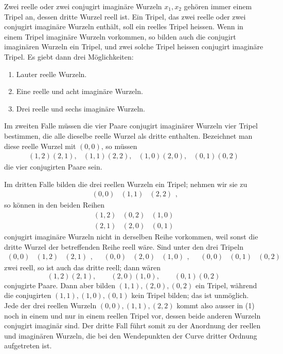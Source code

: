 \documentclass[11pt]{article}
\providecommand{\trip}[3]{\begin{array}{ccc}#1&#2&#3\end{array}}
\providecommand{\trip}[3]{\begin{array}{ccc}#1&#2&#3\end{array}}
\begin{document}
Zwei reelle oder zwei conjugirt imaginäre Wurzeln \(x_1,x_2\) gehören immer einem Tripel an, dessen dritte Wurzel reell ist. Ein Tripel, das zwei reelle oder zwei conjugirt imaginäre Wurzeln enthält, soll ein reelles Tripel heissen. Wenn in einem Tripel imaginäre Wurzeln vorkommen, so bilden auch die conjugirt imaginären Wurzeln ein Tripel, und zwei solche Tripel heissen conjugirt imaginäre Tripel. Es giebt dann drei Möglichkeiten:
\begin{enumerate}[label=\arabic*.]
\item Lauter reelle Wurzeln.
\item Eine reelle und acht imaginäre Wurzeln.
\item Drei reelle und sechs imaginäre Wurzeln.
\end{enumerate}

Im zweiten Falle müssen die vier Paare conjugirt imaginärer Wurzeln vier Tripel bestimmen, die alle dieselbe reelle Wurzel als dritte enthalten. Bezeichnet man diese reelle Wurzel mit \((0,0)\), so müssen
\[
\begin{array}{cccc}
(1,2)(2,1),&(1,1)(2,2),&(1,0)(2,0),&(0,1)(0,2)
\end{array}
\]
die vier conjugirten Paare sein.

Im dritten Falle bilden die drei reellen Wurzeln ein Tripel; nehmen wir sie zu
\begin{equation}
 \trip{(0,0)}{(1,1)}{(2,2)},
 \tag{1}
\end{equation}
so können in den beiden Reihen
\begin{equation}
\begin{array}{ccc}
(1,2)&(0,2)&(1,0)\\
(2,1)&(2,0)&(0,1)
\end{array}
\tag{2}
\end{equation}
conjugirt imaginäre Wurzeln nicht in derselben Reihe vorkommen, weil sonst die dritte Wurzel der betreffenden Reihe reell wäre. Sind unter den drei Tripeln
\[
\trip{(0,0)}{(1,2)}{(2,1)},
\quad
\trip{(0,0)}{(2,0)}{(1,0)},
\quad
\trip{(0,0)}{(0,1)}{(0,2)}
\]
zwei reell, so ist auch das dritte reell; dann wären
\[
(1,2)(2,1),
\qquad
(2,0)(1,0),
\qquad
(0,1)(0,2)
\]
conjugirte Paare. Dann aber bilden \((1,1),(2,0),(0,2)\) ein Tripel, während die conjugirten \((1,1),(1,0),(0,1)\) kein Tripel bilden; das ist unmöglich. Jede der drei reellen Wurzeln \((0,0),(1,1),(2,2)\) kommt also ausser in (1) noch in einem und nur in einem reellen Tripel vor, dessen beide anderen Wurzeln conjugirt imaginär sind. Der dritte Fall führt somit zu der Anordnung der reellen und imaginären Wurzeln, die bei den Wendepunkten der Curve dritter Ordnung aufgetreten ist.
\end{document}
